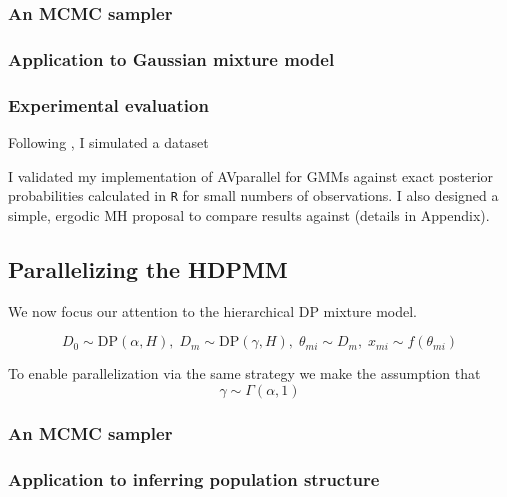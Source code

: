 \documentclass{uwstat572}
\begin{document}
\subsubsection{An MCMC sampler}

\subsubsection{Application to Gaussian mixture model}



\subsubsection{Experimental evaluation}

Following \citet{WDX13}, I simulated a dataset

\citet{GG14}

I validated my implementation of AVparallel for GMMs against exact posterior probabilities calculated in \texttt{R} for small numbers of observations.
I also designed a simple, ergodic MH proposal to compare results against (details in Appendix).

\subsection{Parallelizing the HDPMM}

We now focus our attention to the hierarchical DP mixture model.

\begin{equation}
  D_0 \sim \text{DP}\left(\alpha, H\right),\;
  D_m \sim \text{DP}\left(\gamma, H\right), \;
  \theta_{mi} \sim D_m, \;
  x_{mi} \sim f\left(\theta_{mi}\right)
\end{equation}

To enable parallelization via the same strategy we make the assumption that
\begin{equation}
  \gamma \sim \Gamma\left(\alpha, 1\right)
\end{equation}

\subsubsection{An MCMC sampler}

\subsubsection{Application to inferring population structure}
\end{document}
